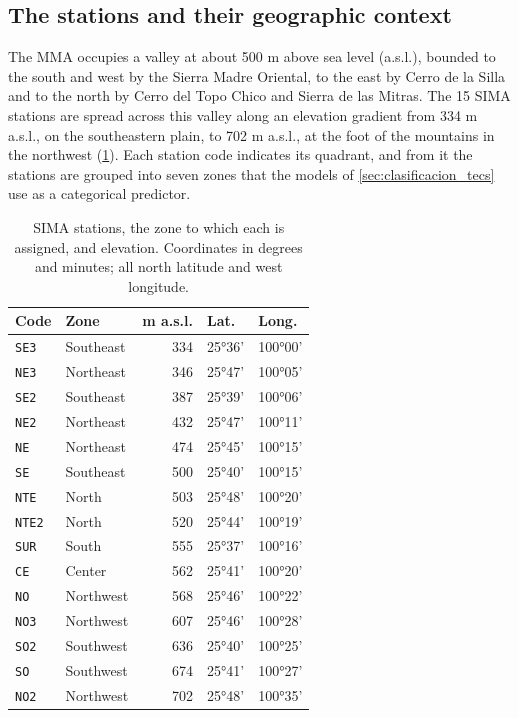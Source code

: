 \subsection{The stations and their geographic context}
\label{sec:contexto-estaciones}

The MMA occupies a valley at about 500 m above sea level (a.s.l.), bounded to
the south and west by the Sierra Madre Oriental, to the east by Cerro de la
Silla and to the north by Cerro del Topo Chico and Sierra de las Mitras. The
15 SIMA stations are spread across this valley along an elevation gradient
from 334 m a.s.l., on the southeastern plain, to 702 m a.s.l., at the foot of
the mountains in the northwest (\cref{tab:estaciones}). Each station code
indicates its quadrant, and from it the stations are grouped into seven
zones that the models of \cref{sec:clasificacion_tecs} use as a categorical
predictor.

\begin{table}[pos=t]
  \centering
  \caption{SIMA stations, the zone to which each is assigned, and elevation.
    Coordinates in degrees and minutes; all north latitude and west
    longitude.}
  \label{tab:estaciones}
  \small
  \begin{tabular}{llrll}
    \toprule
    Code & Zone & m a.s.l. & Lat. & Long. \\
    \midrule
    \texttt{SE3}  & Southeast & 334 & 25°36' & 100°00'  \\
    \texttt{NE3}  & Northeast & 346 & 25°47' & 100°05' \\
    \texttt{SE2}  & Southeast & 387 & 25°39' & 100°06' \\
    \texttt{NE2}  & Northeast & 432 & 25°47' & 100°11' \\
    \texttt{NE}   & Northeast & 474 & 25°45' & 100°15' \\
    \texttt{SE}   & Southeast & 500 & 25°40' & 100°15' \\
    \texttt{NTE}  & North     & 503 & 25°48' & 100°20' \\
    \texttt{NTE2} & North     & 520 & 25°44' & 100°19' \\
    \texttt{SUR}  & South     & 555 & 25°37' & 100°16' \\
    \texttt{CE}   & Center    & 562 & 25°41' & 100°20' \\
    \texttt{NO}   & Northwest & 568 & 25°46' & 100°22' \\
    \texttt{NO3}  & Northwest & 607 & 25°46' & 100°28' \\
    \texttt{SO2}  & Southwest & 636 & 25°40' & 100°25' \\
    \texttt{SO}   & Southwest & 674 & 25°41' & 100°27' \\
    \texttt{NO2}  & Northwest & 702 & 25°48' & 100°35' \\
    \bottomrule
  \end{tabular}
\end{table}

